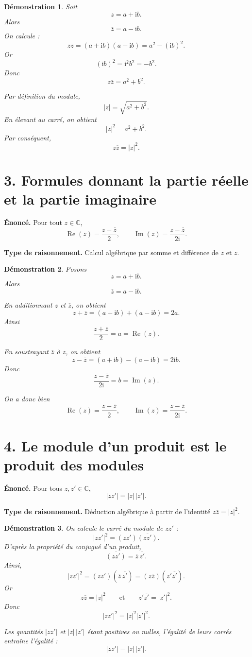 \documentclass[11pt,a4paper]{article}
\newtheorem{prop}{Démonstration}
\newcommand{\C}{\mathbb{C}}
\newcommand{\ii}{\mathrm{i}}
\newcommand{\Reel}{\operatorname{Re}}
\newcommand{\Imag}{\operatorname{Im}}
\begin{document}
\begin{prop}
Soit
\[
z=a+\ii b.
\]
Alors
\[
\overline z=a-\ii b.
\]
On calcule :
\[
z\overline z=(a+\ii b)(a-\ii b)=a^2-(\ii b)^2.
\]
Or
\[
(\ii b)^2=\ii^2b^2=-b^2.
\]
Donc
\[
z\overline z=a^2+b^2.
\]

Par définition du module,
\[
|z|=\sqrt{a^2+b^2}.
\]
En élevant au carré, on obtient
\[
|z|^2=a^2+b^2.
\]
Par conséquent,
\[
z\overline z=|z|^2.
\]
\end{prop}

\section*{3. Formules donnant la partie réelle et la partie imaginaire}

\textbf{Énoncé.} Pour tout $z\in\C$,
\[
\Reel(z)=\frac{z+\overline z}{2},
\qquad
\Imag(z)=\frac{z-\overline z}{2\ii}.
\]

\textbf{Type de raisonnement.} Calcul algébrique par somme et différence de $z$ et $\overline z$.

\begin{prop}
Posons
\[
z=a+\ii b.
\]
Alors
\[
\overline z=a-\ii b.
\]

En additionnant $z$ et $\overline z$, on obtient
\[
z+\overline z=(a+\ii b)+(a-\ii b)=2a.
\]
Ainsi
\[
\frac{z+\overline z}{2}=a=\Reel(z).
\]

En soustrayant $\overline z$ à $z$, on obtient
\[
z-\overline z=(a+\ii b)-(a-\ii b)=2\ii b.
\]
Donc
\[
\frac{z-\overline z}{2\ii}=b=\Imag(z).
\]

On a donc bien
\[
\Reel(z)=\frac{z+\overline z}{2},
\qquad
\Imag(z)=\frac{z-\overline z}{2\ii}.
\]
\end{prop}

\section*{4. Le module d'un produit est le produit des modules}

\textbf{Énoncé.} Pour tous $z,z'\in\C$,
\[
|zz'|=|z|\,|z'|.
\]

\textbf{Type de raisonnement.} Déduction algébrique à partir de l'identité $z\overline z=|z|^2$.

\begin{prop}
On calcule le carré du module de $zz'$ :
\[
|zz'|^2=(zz')\overline{(zz')}.
\]
D'après la propriété du conjugué d'un produit,
\[
\overline{(zz')}=\overline z\,\overline{z'}.
\]
Ainsi,
\[
|zz'|^2=(zz')(\overline z\,\overline{z'})=(z\overline z)(z'\overline{z'}).
\]
Or
\[
z\overline z=|z|^2
\qquad \text{et} \qquad
z'\overline{z'}=|z'|^2.
\]
Donc
\[
|zz'|^2=|z|^2|z'|^2.
\]

Les quantités $|zz'|$ et $|z|\,|z'|$ étant positives ou nulles, l'égalité de leurs carrés entraîne l'égalité :
\[
|zz'|=|z|\,|z'|.
\]
\end{prop}
\end{document}
